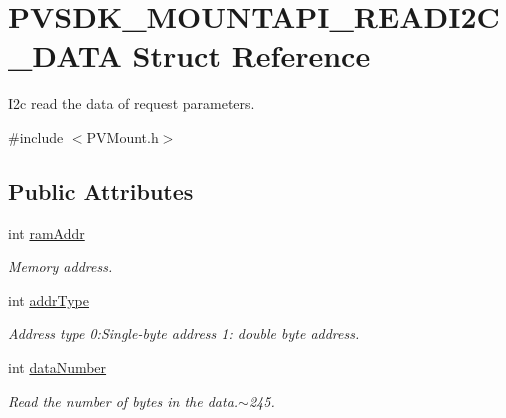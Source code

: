 \hypertarget{struct_p_v_s_d_k___m_o_u_n_t_a_p_i___r_e_a_d_i2_c___d_a_t_a}{}\section{P\+V\+S\+D\+K\+\_\+\+M\+O\+U\+N\+T\+A\+P\+I\+\_\+\+R\+E\+A\+D\+I2\+C\+\_\+\+D\+A\+TA Struct Reference}
\label{struct_p_v_s_d_k___m_o_u_n_t_a_p_i___r_e_a_d_i2_c___d_a_t_a}


I2c read the data of request parameters.  




{\ttfamily \#include $<$P\+V\+Mount.\+h$>$}

\subsection*{Public Attributes}
\begin{DoxyCompactItemize}
\item 
\mbox{\label{struct_p_v_s_d_k___m_o_u_n_t_a_p_i___r_e_a_d_i2_c___d_a_t_a_aa8a7a6997c79ccaf11803d998bd4969b}} 
int \hyperlink{struct_p_v_s_d_k___m_o_u_n_t_a_p_i___r_e_a_d_i2_c___d_a_t_a_aa8a7a6997c79ccaf11803d998bd4969b}{ram\+Addr}
\begin{DoxyCompactList}\small\item\em Memory address. \end{DoxyCompactList}\item 
\mbox{\label{struct_p_v_s_d_k___m_o_u_n_t_a_p_i___r_e_a_d_i2_c___d_a_t_a_ad3c1634013fc2e8bb0e63e3a006c0882}} 
int \hyperlink{struct_p_v_s_d_k___m_o_u_n_t_a_p_i___r_e_a_d_i2_c___d_a_t_a_ad3c1634013fc2e8bb0e63e3a006c0882}{addr\+Type}
\begin{DoxyCompactList}\small\item\em Address type 0\+:Single-\/byte address 1\+: double byte address. \end{DoxyCompactList}\item 
\mbox{\label{struct_p_v_s_d_k___m_o_u_n_t_a_p_i___r_e_a_d_i2_c___d_a_t_a_aab8b9d25da76eb5e3d938829eafc53e7}} 
int \hyperlink{struct_p_v_s_d_k___m_o_u_n_t_a_p_i___r_e_a_d_i2_c___d_a_t_a_aab8b9d25da76eb5e3d938829eafc53e7}{data\+Number}
\begin{DoxyCompactList}\small\item\em Read the number of bytes in the data.$\sim$245. \end{DoxyCompactList}\end{DoxyCompactItemize}


